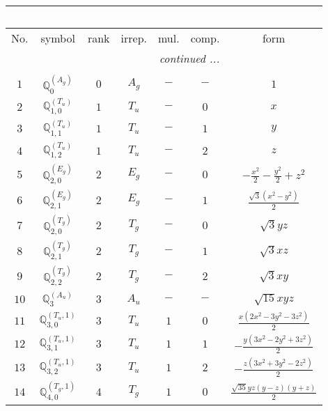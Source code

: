 \documentclass[fleqn,10pt,landscape]{article}
\begin{document}
\begin{itemize}
\begin{center}
\begin{longtable}{ccccccc}
\multicolumn{6}{l}{\tablename\ \thetable{}} \\
 \hline \hline
No. & symbol & rank & irrep. & mul. & comp. & form \\ \hline \endhead

 \hline \hline
\multicolumn{6}{r}{\footnotesize\it continued ...} \\ \endfoot

 \hline \hline
\multicolumn{6}{r}{} \\ \endlastfoot

$ 1 $ & $ \mathbb{Q}_{0}^{(A_{g})} $ & $ 0 $ & $ A_{g} $ & $ - $ & $ - $ & $ 1 $ \\ \hline
$ 2 $ & $ \mathbb{Q}_{1,0}^{(T_{u})} $ & $ 1 $ & $ T_{u} $ & $ - $ & $ 0 $ & $ x $ \\
$ 3 $ & $ \mathbb{Q}_{1,1}^{(T_{u})} $ & $ 1 $ & $ T_{u} $ & $ - $ & $ 1 $ & $ y $ \\
$ 4 $ & $ \mathbb{Q}_{1,2}^{(T_{u})} $ & $ 1 $ & $ T_{u} $ & $ - $ & $ 2 $ & $ z $ \\ \hline
$ 5 $ & $ \mathbb{Q}_{2,0}^{(E_{g})} $ & $ 2 $ & $ E_{g} $ & $ - $ & $ 0 $ & $ - \frac{x^{2}}{2} - \frac{y^{2}}{2} + z^{2} $ \\
$ 6 $ & $ \mathbb{Q}_{2,1}^{(E_{g})} $ & $ 2 $ & $ E_{g} $ & $ - $ & $ 1 $ & $ \frac{\sqrt{3} \left(x^{2} - y^{2}\right)}{2} $ \\
$ 7 $ & $ \mathbb{Q}_{2,0}^{(T_{g})} $ & $ 2 $ & $ T_{g} $ & $ - $ & $ 0 $ & $ \sqrt{3} y z $ \\
$ 8 $ & $ \mathbb{Q}_{2,1}^{(T_{g})} $ & $ 2 $ & $ T_{g} $ & $ - $ & $ 1 $ & $ \sqrt{3} x z $ \\
$ 9 $ & $ \mathbb{Q}_{2,2}^{(T_{g})} $ & $ 2 $ & $ T_{g} $ & $ - $ & $ 2 $ & $ \sqrt{3} x y $ \\ \hline
$ 10 $ & $ \mathbb{Q}_{3}^{(A_{u})} $ & $ 3 $ & $ A_{u} $ & $ - $ & $ - $ & $ \sqrt{15} x y z $ \\
$ 11 $ & $ \mathbb{Q}_{3,0}^{(T_{u},1)} $ & $ 3 $ & $ T_{u} $ & $ 1 $ & $ 0 $ & $ \frac{x \left(2 x^{2} - 3 y^{2} - 3 z^{2}\right)}{2} $ \\
$ 12 $ & $ \mathbb{Q}_{3,1}^{(T_{u},1)} $ & $ 3 $ & $ T_{u} $ & $ 1 $ & $ 1 $ & $ - \frac{y \left(3 x^{2} - 2 y^{2} + 3 z^{2}\right)}{2} $ \\
$ 13 $ & $ \mathbb{Q}_{3,2}^{(T_{u},1)} $ & $ 3 $ & $ T_{u} $ & $ 1 $ & $ 2 $ & $ - \frac{z \left(3 x^{2} + 3 y^{2} - 2 z^{2}\right)}{2} $ \\ \hline
$ 14 $ & $ \mathbb{Q}_{4,0}^{(T_{g},1)} $ & $ 4 $ & $ T_{g} $ & $ 1 $ & $ 0 $ & $ \frac{\sqrt{35} y z \left(y - z\right) \left(y + z\right)}{2} $ \\

\end{longtable}
\end{center}
\end{itemize}
\end{document}
